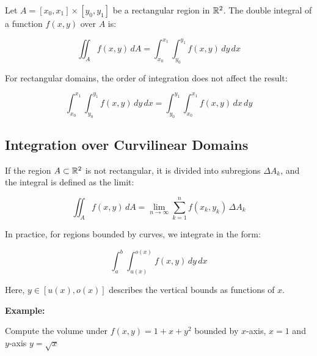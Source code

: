 Let \( A = [x_0, x_1] \times [y_0, y_1] \) be a rectangular region in \( \mathbb{R}^2 \). The double integral of a function \( f(x, y) \) over \( A \) is:

\[
    \iint_A f(x, y)\, dA = \int_{x_0}^{x_1} \int_{y_0}^{y_1} f(x, y)\, dy\, dx
\]

For rectangular domains, the order of integration does not affect the result:

\[
    \int_{x_0}^{x_1} \int_{y_0}^{y_1} f(x, y)\, dy\, dx = \int_{y_0}^{y_1} \int_{x_0}^{x_1} f(x, y)\, dx\, dy
\]

\subsection{Integration over Curvilinear Domains}

If the region \( A \subset \mathbb{R}^2 \) is not rectangular, it is divided into subregions \( \Delta A_k \), and the integral is defined as the limit:

\[
    \iint_A f(x, y)\, dA = \lim_{n \to \infty} \sum_{k=1}^n f(x_k, y_k) \, \Delta A_k
\]

In practice, for regions bounded by curves, we integrate in the form:

\[
    \int_a^b \int_{u(x)}^{o(x)} f(x, y)\, dy\, dx
\]

Here, \( y \in [u(x), o(x)] \) describes the vertical bounds as functions of \( x \).
\vspace{\baselineskip}

\textbf{Example:}
\vspace{\baselineskip}

Compute the volume under \(f(x,y) = 1 + x + y^2\) bounded by \(x\)-axis, \(x = 1\) and \(y\)-axis \(y = \sqrt{x}\)

\begin{center}
\end{center}

